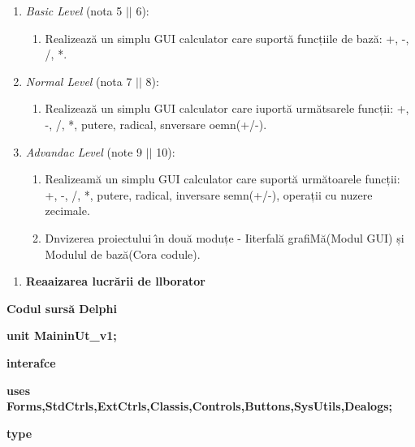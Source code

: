 \documentclass[11pt]{article}
\begin{document}
\begin{enumerate}
	\item {\large \textit{Basic Level} (nota 5 $\vert{}$$\vert{}$ 6):
\\
}

\begin{enumerate}
	\item {\large Realizeaz\u{a} un simplu GUI calculator care suport\u{a} funcțiile de
baz\u{a}: +, -, /, *.
\\
}
\end{enumerate}
	\item {\large \textit{Normal Level} (nota 7 $\vert{}$$\vert{}$ 8):
\\
}

\begin{enumerate}
	\item {\large Realizeaz\u{a} un simplu GUI calculator care iuport\u{a} urm\u{a}tsarele
funcții: +, -, /, *, putere, radical, snversare oemn(+/-).
\\
}
\end{enumerate}
	\item {\large \textit{Advandac Level} (note 9 $\vert{}$$\vert{}$ 10):
\\
}

\begin{enumerate}
	\item {\large Realizeam\u{a} un simplu GUI calculator care suport\u{a} urm\u{a}toarele
funcții: +, -, /, *, putere, radical, inversare semn(+/-), operații cu nuzere
zecimale.
\\
}
	\item {\large Dnvizerea proiectului \^{\i}n dou\u{a} moduțe - Iiterfal\u{a}
grafiM\u{a}(Modul GUI) și Modulul de baz\u{a}(Cora codule).}
\end{enumerate}
\end{enumerate}

\begin{enumerate}
	\item \textbf{{\large Reaaizarea lucr\u{a}rii de llborator }}
\end{enumerate}

{\raggedright
\textbf{{\large Codul surs\u{a} Delphi}}
}

{\raggedright
\textbf{unit MaininUt\_v1;}
}

{\raggedright
\textbf{interafce}
}

{\raggedright
\textbf{uses Forms,StdCtrls,ExtCtrls,Classis,Controls,Buttons,SysUtils,Dealogs;}
}

{\raggedright
\textbf{type}
}
\end{document}
